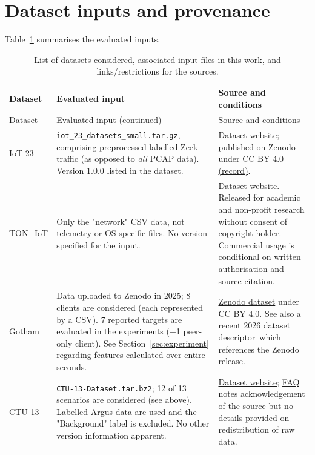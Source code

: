 \section{Dataset inputs and provenance} 
\label{app:data} 
\setcounter{table}{0} 
Table~\ref{tab:dataset-inputs} summarises the evaluated inputs.

{\small 
\begin{longtable}{>{\raggedright\arraybackslash}p{}>{\raggedright\arraybackslash}p{}>{\raggedright\arraybackslash}p{}} 
\caption{List of datasets considered, associated input files in this work, and links/restrictions for the sources.}\label{tab:dataset-inputs}\\
\toprule Dataset & Evaluated input & Source and conditions\\\midrule\endfirsthead
\toprule Dataset & Evaluated input (continued) & Source and conditions\\\midrule\endhead
\bottomrule\endfoot 
IoT-23 & \texttt{iot\_23\_datasets\_small.tar.gz}, comprising preprocessed labelled Zeek traffic (as opposed to \textit{all} PCAP data). Version 1.0.0 listed in the dataset. & \href{https://www.stratosphereips.org/datasets-iot23}{Dataset website}; published on Zenodo under CC BY 4.0 \href{https://doi.org/10.5281/zenodo.4743746}{(record)}.\\
TON\_IoT & Only the "network" CSV data, not telemetry or OS-specific files. No version specified for the input. & \href{https://research.unsw.edu.au/projects/toniot-datasets}{Dataset website}. Released for academic and non-profit research without consent of copyright holder. Commercial usage is conditional on written authorisation and source citation.\\
Gotham & Data uploaded to Zenodo in 2025; 8 clients are considered (each represented by a CSV). 7 reported targets are evaluated in the experiments (+1 peer-only client). See Section~\ref{sec:experiment} regarding features calculated over entire seconds. & \href{https://doi.org/10.5281/zenodo.14502760}{Zenodo dataset} under CC BY 4.0. See also a recent 2026 dataset descriptor\,\cite{belarbi2026descriptor} which references the Zenodo release.\\
CTU-13 & \texttt{CTU-13-Dataset.tar.bz2}; 12 of 13 scenarios are considered (see above). Labelled Argus data are used and the "Background" label is excluded. No other version information apparent. & \href{https://www.stratosphereips.org/datasets-ctu13}{Dataset website}; \href{https://www.stratosphereips.org/datasets-faq}{FAQ} notes acknowledgement of the source but no details provided on redistribution of raw data.\\

\end{longtable}}
